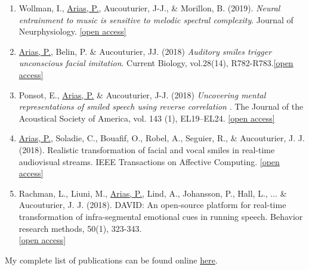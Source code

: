 \documentclass[a4paper, 11pt]{article}
\begin{document}
\begin{enumerate}[1.]
\item Wollman, I., \ul{Arias, P.}, Aucouturier, J-J., \& Morillon, B. (2019). \emph{Neural entrainment to music is sensitive to melodic spectral complexity}. Journal of Neurphysiology. {\footnotesize \href{https://hal.archives-ouvertes.fr/hal-02475989/document}{[open access]}}


\item \ul{Arias, P.}, Belin, P. \& Aucouturier, JJ. (2018) \emph{Auditory smiles trigger unconscious facial imitation}. Current Biology, vol.28(14), R782-R783.{\footnotesize \href{https ://www.cell.com/current-biology/fulltext/S0960-9822(18)30752-8}{[open access]}}

\item Ponsot, E., \ul{Arias, P.} \& Aucouturier, J-J. (2018) \emph{Uncovering mental representations of smiled speech using reverse correlation
}. The Journal of the Acoustical Society of America, vol. 143 (1), EL19--EL24. {\footnotesize \href{https://asa.scitation.org/doi/abs/10.1121/1.5020989}{[open access]}}

\item \ul{Arias, P.}, Soladie, C., Bouafif, O., Robel, A., Seguier, R., \& Aucouturier, J. J. (2018). Realistic transformation of facial and vocal smiles in real-time audiovisual streams. IEEE Transactions on Affective Computing. {\footnotesize \href{https://ieeexplore.ieee.org/stamp/stamp.jsp?arnumber=8307228}{[open access]}}

\item Rachman, L., Liuni, M., \ul{Arias, P.}, Lind, A., Johansson, P., Hall, L., ... \& Aucouturier, J. J. (2018). DAVID: An open-source platform for real-time transformation of infra-segmental emotional cues in running speech. Behavior research methods, 50(1), 323-343. \\{\footnotesize \href{https://link.springer.com/article/10.3758/s13428-017-0873-y}{[open access]}}

\end{enumerate}
\vskip 6pt 
\noindent My complete list of publications can be found online \href{https://scholar.google.fr/citations?user=6jMFwJQAAAAJ&hl=en&oi=ao}{here}. 
\end{document}

